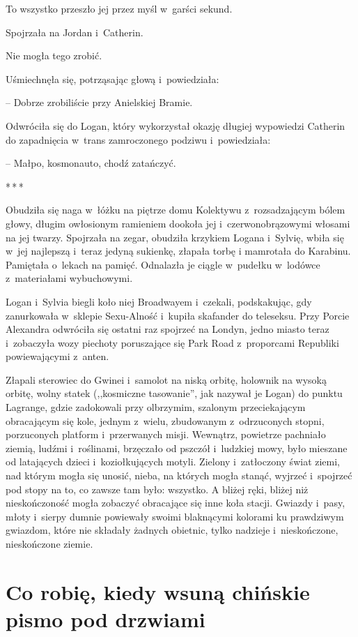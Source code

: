 \documentclass[oneside,polish,11pt,sfheadings]{mwbk}
\newcommand{\threeast}{\bigskip\par\centerline{*\,*\,*}\medskip\par}%
\begin{document}
To wszystko przeszło jej przez myśl w~garści sekund.

Spojrzała na Jordan i~Catherin.

Nie mogła tego zrobić.

Uśmiechnęła się, potrząsając głową i~powiedziała: 

-- Dobrze zrobiliście
przy Anielskiej Bramie.

Odwróciła się do Logan, który wykorzystał okazję długiej wypowiedzi
Catherin do zapadnięcia w~trans zamroczonego podziwu i~powiedziała: 

-- Małpo, kosmonauto, chodź zatańczyć.
  \threeast 

Obudziła się naga w~łóżku na piętrze domu Kolektywu z~rozsadzającym
bólem głowy, długim owłosionym ramieniem dookoła jej i~czerwonobrązowymi
włosami na jej twarzy. Spojrzała na zegar, obudziła krzykiem Logana i~Sylvię, wbiła się w~jej najlepszą i~teraz jedyną sukienkę, złapała torbę
i mamrotała do Karabinu. Pamiętała o~lekach na pamięć. Odnalazła je
ciągle w~pudełku w~lodówce z~materiałami wybuchowymi.

Logan i~Sylvia biegli koło niej Broadwayem i~czekali, podskakując, gdy
zanurkowała w~sklepie Sexu-Alność i~kupiła skafander do teleseksu. Przy
Porcie Alexandra odwróciła się ostatni raz spojrzeć na Londyn, jedno
miasto teraz i~zobaczyła wozy piechoty poruszające się Park Road z~proporcami Republiki powiewającymi z~anten.

Złapali sterowiec do Gwinei i~samolot na niską orbitę, holownik na
wysoką orbitę, wolny statek (,,kosmiczne tasowanie'', jak nazywał je
Logan) do punktu Lagrange, gdzie zadokowali przy olbrzymim, szalonym
przeciekającym obracającym się kole, jednym z~wielu, zbudowanym z~odrzuconych stopni, porzuconych platform i~przerwanych misji. Wewnątrz,
powietrze pachniało ziemią, ludźmi i~roślinami, brzęczało od pszczół i~ludzkiej mowy, było mieszane od latających dzieci i~koziołkujących
motyli. Zielony i~zatłoczony świat ziemi, nad którym mogła się unosić,
nieba, na których mogła stanąć, wyjrzeć i~spojrzeć pod stopy na to, co
zawsze tam było: wszystko. A bliżej ręki, bliżej niż nieskończoność
mogła zobaczyć obracające się inne koła stacji. Gwiazdy i~pasy, młoty i~sierpy dumnie powiewały swoimi blaknącymi kolorami ku prawdziwym
gwiazdom, które nie składały żadnych obietnic, tylko nadzieje i~nieskończone, nieskończone ziemie.

\chapter{Co robię, kiedy wsuną chińskie pismo pod drzwiami}
\end{document}
